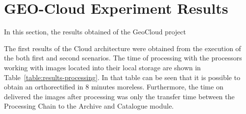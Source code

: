 \section{GEO-Cloud Experiment Results}
\label{sec:geocloud-results}

In this section, the results obtained of the GeoCloud project 

The first results of the Cloud architecture were obtained from the execution of
the both first and second scenarios. The time of processing with the processors
working with images located into their local storage are shown in
Table~\ref{table:results-processing}. In that table can be seen that it is
possible to obtain an orthorectified in 8 minutes moreless.  
Furthermore, the time on delivered the
images after processing was only the transfer time between the Processing Chain
to the Archive and Catalogue module. 
